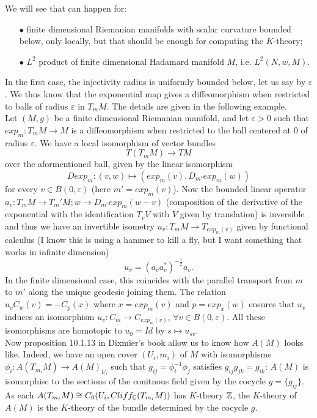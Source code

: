 We will see that can happen for:
\begin{itemize}
\item[$\bullet$] finite dimensional Riemanian manifolds with scalar curvature bounded below, only locally, but that should be enough for computing the $K$-theory;
\item[$\bullet$] $L^2$ product of finite dimensional Hadamard manifold $M$, i.e. $L^2(N,w,M)$.
\end{itemize}

In the first case, the injectivity radius is uniformly bounded below, let us say by $\varepsilon$. We thus know that the exponential map gives a diffeomorphism when restricted to balls of radius $\varepsilon$ in $T_m M$. The details are given in the following example.\\ 

Let $(M,g)$ be a finite dimensional Riemanian manifold, and let $\varepsilon>0$ such that $exp_m: T_m M \rightarrow M$ is a diffeomorphism when restricted to the ball centered at $0$ of radius $\varepsilon$. We have a local isomorphism of vector bundles
\[T(T_m M)\rightarrow TM\]
over the aformentioned ball, given by the linear isomorphism 
\[Dexp_m : (v,w) \mapsto (exp_m(v) ,  D_{m'} exp_m (w))\] 
for every $v\in B(0,\varepsilon)$ (here $m'= exp_m(v)$). Now the bounded linear operator $a_v :T_m M  \rightarrow T_m' M ; w \rightarrow D_{m'} exp_m (w-v)$ (composition of the derivative of the exponential with the identification $T_v V $ with $V$ given by translation) is inversible and thus we have an invertible isometry $u_v: T_m M \rightarrow T_{exp_m(v)}$ given by functional calculus (I know this is using a hammer to kill a fly, but I want something that works in infinite dimension)
\[u_v = (a_v a_v^*)^{-\frac{1}{2}}a_v.\]
In the finite dimensional case, this coincides with the parallel transport from $m$ to $m'$ along the unique geodesic joining them. The relation $u_v C_w (v) = - C_p(x)$ where $x=exp_m(v)$ and $p=exp_x(w)$ ensures that $u_v$ induces an isomorphism $u_v: C_m \rightarrow C_{exp_m(v)}$, $\forall v\in B(0,\varepsilon)$. All these isomorphisms are homotopic to $u_0 = Id$ by $s\mapsto u_{sv}$. \\

Now proposition 10.1.13 in Dixmier's book \cite{dixmier} allow us to know how $A(M)$ looks like. Indeed, we have an open cover $(U_i,m_i)$ of $M$ with isomorphisms $\phi_i : A(T_{m_i}M) \rightarrow A(M)_{U_i}$ such that $g_{ij}= \phi_i^{-1} \phi_j$ satisfies $g_{ij}g_{jk} = g_{ik}$: $A(M)$ is isomorphisc to the sections of the conitnous field given by the cocycle $g=\{g_{ij}\}$. As each $A(T_{m_i}M) \cong C_0(U_i,Cliff_\mathbb C(T_{m_i}M ))$ has $K$-theory $\mathbb Z$, the $K$-theory of $A(M)$ is the $K$-theory of the bundle determined by the cocycle $g$.\\

